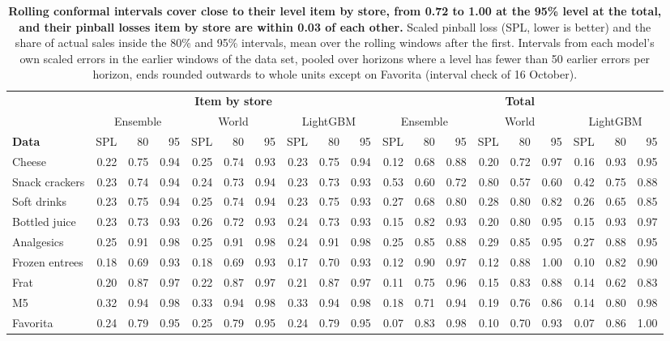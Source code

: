 \begin{table}[t]
\centering
\caption{\textbf{Rolling conformal intervals cover close to their level item by store, from 0.72 to 1.00 at the
95\% level at the total, and their pinball losses item by store are within 0.03 of each other.} Scaled pinball loss (SPL, lower is better) and the share of actual sales
inside the 80\% and 95\% intervals, mean over the rolling windows after the first. Intervals from each model's own
scaled errors in the earlier windows of the data set, pooled over horizons where a level has fewer than 50 earlier
errors per horizon, ends rounded outwards to whole units except on Favorita (interval check of 16 October).}
\label{tab:intervals}
\footnotesize
\setlength{\tabcolsep}{2.6pt}
\begin{tabular}{l*{18}{r}}
\toprule
 & \multicolumn{9}{c}{\textbf{Item by store}} & \multicolumn{9}{c}{\textbf{Total}} \\
\cmidrule(lr){2-10}\cmidrule(lr){11-19}
 & \multicolumn{3}{c}{Ensemble} & \multicolumn{3}{c}{World} & \multicolumn{3}{c}{LightGBM}
 & \multicolumn{3}{c}{Ensemble} & \multicolumn{3}{c}{World} & \multicolumn{3}{c}{LightGBM} \\
\cmidrule(lr){2-4}\cmidrule(lr){5-7}\cmidrule(lr){8-10}\cmidrule(lr){11-13}\cmidrule(lr){14-16}\cmidrule(lr){17-19}
\textbf{Data} & SPL & 80 & 95 & SPL & 80 & 95 & SPL & 80 & 95 & SPL & 80 & 95 & SPL & 80 & 95 & SPL & 80 & 95 \\
\midrule
Cheese & 0.22 & 0.75 & 0.94 & 0.25 & 0.74 & 0.93 & 0.23 & 0.75 & 0.94 & 0.12 & 0.68 & 0.88 & 0.20 & 0.72 & 0.97 & 0.16 & 0.93 & 0.95 \\
Snack crackers & 0.23 & 0.74 & 0.94 & 0.24 & 0.73 & 0.94 & 0.23 & 0.73 & 0.93 & 0.53 & 0.60 & 0.72 & 0.80 & 0.57 & 0.60 & 0.42 & 0.75 & 0.88 \\
Soft drinks & 0.23 & 0.75 & 0.94 & 0.25 & 0.74 & 0.94 & 0.23 & 0.75 & 0.93 & 0.27 & 0.68 & 0.80 & 0.28 & 0.80 & 0.82 & 0.26 & 0.65 & 0.85 \\
Bottled juice & 0.23 & 0.73 & 0.93 & 0.26 & 0.72 & 0.93 & 0.24 & 0.73 & 0.93 & 0.15 & 0.82 & 0.93 & 0.20 & 0.80 & 0.95 & 0.15 & 0.93 & 0.97 \\
Analgesics & 0.25 & 0.91 & 0.98 & 0.25 & 0.91 & 0.98 & 0.24 & 0.91 & 0.98 & 0.25 & 0.85 & 0.88 & 0.29 & 0.85 & 0.95 & 0.27 & 0.88 & 0.95 \\
Frozen entrees & 0.18 & 0.69 & 0.93 & 0.18 & 0.69 & 0.93 & 0.17 & 0.70 & 0.93 & 0.12 & 0.90 & 0.97 & 0.12 & 0.88 & 1.00 & 0.10 & 0.82 & 0.90 \\
Frat & 0.20 & 0.87 & 0.97 & 0.22 & 0.87 & 0.97 & 0.21 & 0.87 & 0.97 & 0.11 & 0.75 & 0.96 & 0.15 & 0.83 & 0.88 & 0.14 & 0.62 & 0.83 \\
M5 & 0.32 & 0.94 & 0.98 & 0.33 & 0.94 & 0.98 & 0.33 & 0.94 & 0.98 & 0.18 & 0.71 & 0.94 & 0.19 & 0.76 & 0.86 & 0.14 & 0.80 & 0.98 \\
Favorita & 0.24 & 0.79 & 0.95 & 0.25 & 0.79 & 0.95 & 0.24 & 0.79 & 0.95 & 0.07 & 0.83 & 0.98 & 0.10 & 0.70 & 0.93 & 0.07 & 0.86 & 1.00 \\
\bottomrule
\end{tabular}
\end{table}
